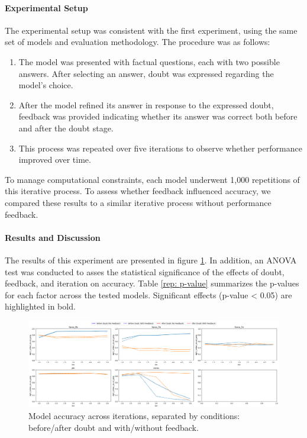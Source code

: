 \paragraph{Experimental Setup}
The experimental setup was consistent with the first experiment, using the same set of models and evaluation methodology. The procedure was as follows:

\begin{enumerate}
  \item The model was presented with factual questions, each with two possible answers. After selecting an answer, doubt was expressed regarding the model's choice.
  \item After the model refined its answer in response to the expressed doubt, feedback was provided indicating whether its answer was correct both before and after the doubt stage.
  \item This process was repeated over five iterations to observe whether performance improved over time.
\end{enumerate}

To manage computational constraints, each model underwent 1,000 repetitions of this iterative process. To assess whether feedback influenced accuracy, we compared these results to a similar iterative process without performance feedback.

\paragraph{Results and Discussion}
The results of this experiment are presented in figure \ref{rep: graph}. In addition, an ANOVA test was conducted to asses the statistical significance of the effects of doubt, feedback, and iteration on accuracy. Table \ref{rep: p-value} summarizes the p-values for each factor across the tested models. Significant effects (p-value < 0.05) are highlighted in bold.

\begin{figure}[h!]
  \centering
  \includegraphics[width=\textwidth]{img/repeted_graph.png} %
  \caption{Model accuracy across iterations, separated by conditions: before/after doubt and with/without feedback.}
  \label{rep: graph}
\end{figure}

